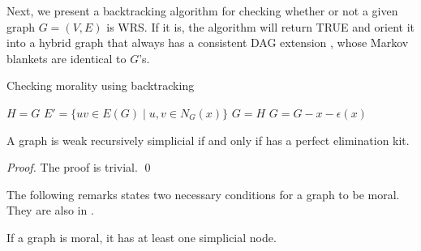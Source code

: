 Next, we present a backtracking algorithm for checking whether or not a given graph $G=(V,E)$ is WRS. If it is, the algorithm will return TRUE and orient it into a hybrid graph that always has a consistent DAG extension \cite{dor1992simple}, whose Markov blankets are identical to $G$'s.
\begin{algorithm}[]
\caption{Checking morality using backtracking}
\label{alg:wrs_bktr}
\begin{algorithmic}[]
	
    \EndIf
    
    	\State $H = G$ 
    	 
    		\State $E'=\{uv \in E(G) \mid u,v\in N_G(x)\}$
    		 
    			\State $G=H$ 
    			\State $G=G-x-\epsilon(x)$ 
        			 
        		\EndIf
      		\EndFor
      	\EndFor
    \EndIf
    
    \State {} 
    \EndFunction
\end{algorithmic}
\end{algorithm}

\begin{theorem}
A graph is weak recursively simplicial if and only if has a perfect elimination kit. 
\end{theorem}
\begin{proof}
The proof is trivial. \qed 
\end{proof}

\iffalse
\begin{definition}
Given a cycle, an \textbf{n-chord} is defined as a path of length $n$ connecting two points on the cycle, where $n$ is less than the shortest path on the cycle connecting those points. 
\end{definition}

\begin{definition}
An \textbf{atomic cycle} is a cycle with no n-chord. 
\end{definition}
\fi

The following remarks states two necessary conditions for a graph to be moral. They are also in \cite{verma1993deciding}. 
\begin{remark}
If a graph is moral, it has at least one simplicial node. 
\end{remark}

